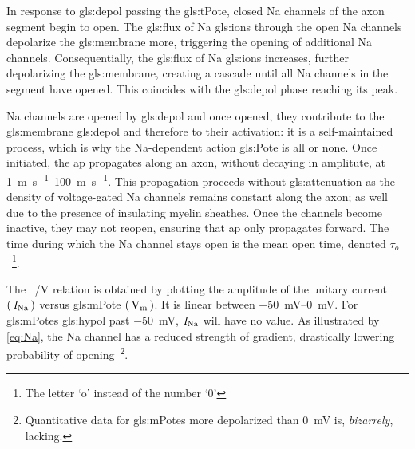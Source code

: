 \documentclass[class={myRUCProject}, crop=false]{standalone}
\begin{document}
In response to \gls{gls:depol} passing the \gls{gls:tPote}, closed \gls{Na} channels of the axon segment begin to open. The \gls{gls:flux} of \gls{Na} \glspl{gls:ion} through the open \gls{Na} channels depolarize the \gls{gls:membrane} more, triggering the opening of additional \gls{Na} channels. 
Consequentially, the \gls{gls:flux} of \gls{Na} \glspl{gls:ion} increases, further depolarizing the \gls{gls:membrane}, creating a cascade until all \gls{Na} channels in the segment have opened. 
This coincides with the \gls{gls:depol} phase reaching its peak. 

\gls{Na} channels are opened by \gls{gls:depol} and once opened, they contribute to the \gls{gls:membrane} \gls{gls:depol} and therefore to their activation: it is a self-maintained process, which is why the \gls{Na}-dependent action \gls{gls:Pote} is all or none. Once initiated, the \gls{ap} propagates along an axon, without decaying in amplitute, at \qtyrange{1}{100}{\meter\per\s}. 
This propagation proceeds without \gls{gls:attenuation} as the density of voltage-gated \gls{Na} channels remains constant along the axon; as well due to the presence of insulating myelin sheathes. 
Once the channels become inactive, they may not reopen, ensuring that \gls{ap} only propagates forward.
The time during which the \gls{Na} channel stays open is the mean open time, denoted \(\tau_o\)~\footnote{The letter  `o' instead of the number `0'}. 

The \unit[per-mode = symbol]{\curr\sodium\per\V} relation is obtained by plotting the amplitude of the unitary current \(\left(\,\mathit{I}_\mathrm{Na}\,\right)\) versus \gls{gls:mPote} \(\br{\unit{\V\membrane}}\). It is linear between \qtyrange{-50}{0}{\mV}. For \glspl{gls:mPote} \gls{gls:hypol} past \qty{-50}{\mV}, \(\mathit{I}_\mathrm{Na}\) will have no value. As illustrated by \cref{eq:Na}, the \gls{Na} channel has a reduced strength of gradient, drastically lowering probability of opening~\footnote{Quantitative data for \glspl{gls:mPote} more depolarized than \qty{0}{\mV} is, \emph{bizarrely}, lacking.}. 
\end{document}
